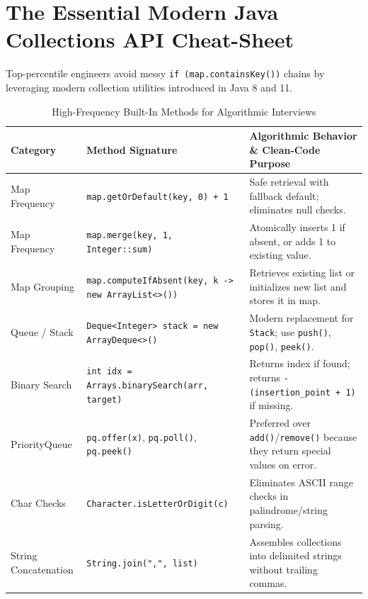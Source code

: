 \documentclass[10pt,journal,compsoc,onecolumn]{IEEEtran}
\begin{document}
\section{The Essential Modern Java Collections API Cheat-Sheet}
\label{sec:cheat_sheet}

Top-percentile engineers avoid messy \texttt{if (map.containsKey())} chains by leveraging modern collection utilities introduced in Java 8 and 11.

\begin{table}[htbp]
\caption{High-Frequency Built-In Methods for Algorithmic Interviews}
\label{tab:builtin_methods}
\centering
\begin{tabular}{llp{6.8cm}}
\toprule
\textbf{Category} & \textbf{Method Signature} & \textbf{Algorithmic Behavior \& Clean-Code Purpose} \\
\midrule
Map Frequency & \texttt{map.getOrDefault(key, 0) + 1} & Safe retrieval with fallback default; eliminates null checks. \\
Map Frequency & \texttt{map.merge(key, 1, Integer::sum)} & Atomically inserts 1 if absent, or adds 1 to existing value. \\
Map Grouping & \texttt{map.computeIfAbsent(key, k -> new ArrayList<>())} & Retrieves existing list or initializes new list and stores it in map. \\
Queue / Stack & \texttt{Deque<Integer> stack = new ArrayDeque<>()} & Modern replacement for \texttt{Stack}; use \texttt{push()}, \texttt{pop()}, \texttt{peek()}. \\
Binary Search & \texttt{int idx = Arrays.binarySearch(arr, target)} & Returns index if found; returns \texttt{-(insertion\_point + 1)} if missing. \\
PriorityQueue & \texttt{pq.offer(x)}, \texttt{pq.poll()}, \texttt{pq.peek()} & Preferred over \texttt{add()}/\texttt{remove()} because they return special values on error. \\
Char Checks & \texttt{Character.isLetterOrDigit(c)} & Eliminates ASCII range checks in palindrome/string parsing. \\
String Concatenation & \texttt{String.join(",", list)} & Assembles collections into delimited strings without trailing commas. \\
\bottomrule
\end{tabular}
\end{table}
\end{document}
